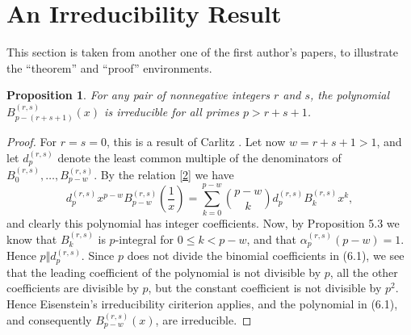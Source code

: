 \documentclass[11pt,reqno]{amsart}
\theoremstyle{plain}
\numberwithin{equation}{section}
\newtheorem{proposition}[thm]{Proposition}
\begin{document}
\section{An Irreducibility Result}

This section is taken from another one of the first author's papers,
to illustrate the ``theorem'' and ``proof'' environments.

\begin{proposition}\label{A}
For any pair of nonnegative integers $r$ and $s$, the polynomial
$B_{p-(r+s+1)}^{(r,s)} (x)$ is irreducible for all primes $p>r+s+1$.
\end{proposition}

\begin{proof}
For $r=s=0$, this is a result of Carlitz \cite{carlitz1}.  Let now
$w=r+s+1>1$, and let $d_p^{(r,s)}$ denote the least common multiple
of the denominators of $B_0^{(r,s)}, \ldots , B_{p-w}^{(r,s)}$.  By
the relation \eqref{2} we have
\begin{equation}\label{11}
d_p^{(r,s)} x^{p-w} B_{p-w}^{(r,s)} \left( \frac{1}{x} \right) =
\sum_{k=0}^{p-w} \binom{p-w}{k} d_p^{(r,s)} B_k^{(r,s)} x^k ,
\end{equation}
and clearly this polynomial has integer coefficients.  Now, by
Proposition 5.3 we know that $B_k^{(r,s)}$ is $p$-integral for $0
\le k < p-w$, and that $\alpha _p^{(r,s)} (p-w) = 1$.  Hence $p
\Vert d_p^{(r,s)}$.  Since $p$ does not divide the binomial
coefficients in (6.1), we see that the leading coefficient of the
polynomial is not divisible by $p$, all the other coefficients are
divisible by $p$, but the constant coefficient is not divisible by
$p^2$.  Hence Eisenstein's irreducibility ciriterion applies, and
the polynomial in (6.1), and consequently $B_{p-w}^{(r,s)} (x)$, are
irreducible.
\end{proof}
\end{document}
